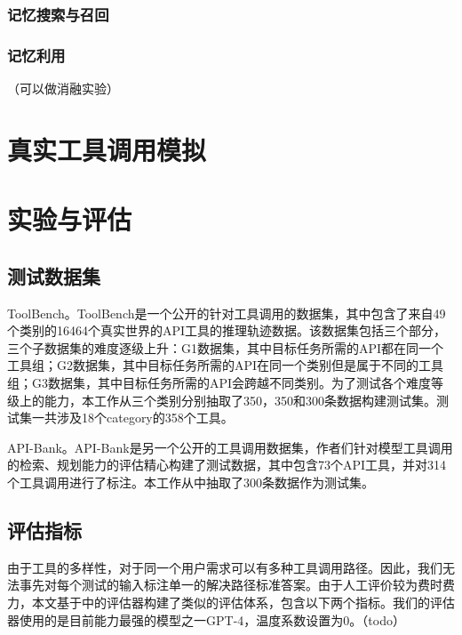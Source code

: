 \subsubsection{记忆搜索与召回}
\subsubsection{记忆利用}
（可以做消融实验）

\section{真实工具调用模拟}
\label{sec:real_tool_simulation}

\section{实验与评估}
\subsection{测试数据集}
\label{subsec:test_dataset}

ToolBench。ToolBench\cite{Qin2023}是一个公开的针对工具调用的数据集，其中包含了来自49个类别的16464个真实世界的API工具的推理轨迹数据。该数据集包括三个部分，三个子数据集的难度逐级上升：G1数据集，其中目标任务所需的API都在同一个工具组；G2数据集，其中目标任务所需的API在同一个类别但是属于不同的工具组；G3数据集，其中目标任务所需的API会跨越不同类别。为了测试各个难度等级上的能力，本工作从三个类别分别抽取了350，350和300条数据构建测试集。测试集一共涉及18个category的358个工具。

API-Bank。API-Bank\cite{Li2023}是另一个公开的工具调用数据集，作者们针对模型工具调用的检索、规划能力的评估精心构建了测试数据，其中包含73个API工具，并对314个工具调用进行了标注。本工作从中抽取了300条数据作为测试集。

\subsection{评估指标}
由于工具的多样性，对于同一个用户需求可以有多种工具调用路径。因此，我们无法事先对每个测试的输入标注单一的解决路径标准答案。由于人工评价较为费时费力，本文基于\cite{Tang2023}中的评估器构建了类似的评估体系，包含以下两个指标。我们的评估器使用的是目前能力最强的模型之一GPT-4，温度系数设置为0。（todo）

